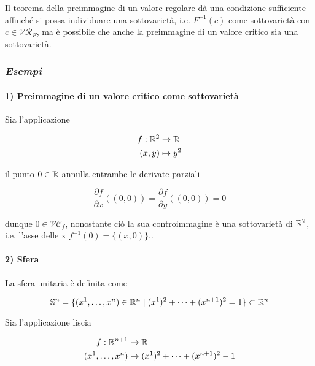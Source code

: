 \begin{remark}
	Il teorema della preimmagine di un valore regolare dà una condizione sufficiente affinché si possa individuare una sottovarietà, i.e. $ F^{-1}(c) $ come sottovarietà con $ c \in \mathcal{VR}_{F} $, ma è possibile che anche la preimmagine di un valore critico sia una sottovarietà.
\end{remark}

\subsubsection{\textit{Esempi}}

\paragraph{1) Preimmagine di un valore critico come sottovarietà}

Sia l'applicazione

\begin{align}
	\begin{split}
		f : \mathbb{R}^{2} &\to \mathbb{R}\\
		(x,y) &\mapsto y^{2}
	\end{split}
\end{align}

il punto $ 0 \in \mathbb{R} $ annulla entrambe le derivate parziali

\begin{equation}
	\dfrac{\partial f}{\partial x} ((0,0)) = \dfrac{\partial f}{\partial y} ((0,0)) = 0
\end{equation}

dunque $ 0 \in \mathcal{VC}_{f} $, nonostante ciò la sua controimmagine è una sottovarietà di $ \mathbb{R}^{2} $, i.e. l'asse delle x $ f^{-1}(0) = \{(x,0)\} $,.

\paragraph{2) Sfera}

La sfera unitaria è definita come

\begin{equation}
	\mathbb{S}^{n} = \{ (x^{1},\dots,x^{n}) \in \mathbb{R}^{n} \mid (x^{1})^{2} + \cdots + (x^{n+1})^{2} = 1 \} \subset \mathbb{R}^{n}
\end{equation}

Sia l'applicazione liscia

\begin{align}
	\begin{split}
		f : \mathbb{R}^{n+1} &\to \mathbb{R}\\
		(x^{1},\dots,x^{n}) &\mapsto (x^{1})^{2} + \cdots + (x^{n+1})^{2} - 1
	\end{split}
\end{align}

